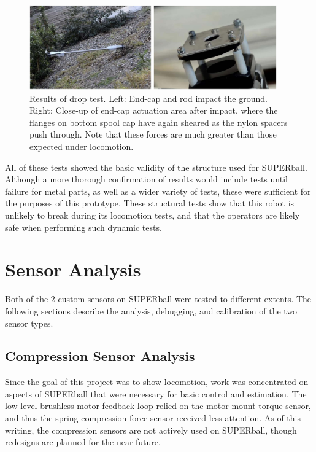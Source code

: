 \documentclass[12pt]{report}
\begin{document}
\begin{figure}[hbt]
  \begin{center}
    \includegraphics[width=0.95\textwidth]{./img/drop_test_results.jpg}
    \caption{Results of drop test. Left: End-cap and rod impact the ground. Right: Close-up of end-cap actuation area after impact, where the flanges on bottom spool cap have again sheared as the nylon spacers push through. Note that these forces are much greater than those expected under locomotion.}
    \label{endcap_drop_test_results}
  \end{center}
\end{figure}

All of these tests showed the basic validity of the structure used for SUPERball.
Although a more thorough confirmation of results would include tests until failure for metal parts, as well as a wider variety of tests, these were sufficient for the purposes of this prototype.
These structural tests show that this robot is unlikely to break during its locomotion tests, and that the operators are likely safe when performing such dynamic tests.


\section{Sensor Analysis}

Both of the 2 custom sensors on SUPERball were tested to different extents.
The following sections describe the analysis, debugging, and calibration of the two sensor types.

\subsection{Compression Sensor Analysis}


Since the goal of this project was to show locomotion, work was concentrated on aspects of SUPERball that were necessary for basic control and estimation.
The low-level brushless motor feedback loop relied on the motor mount torque sensor, and thus the spring compression force sensor received less attention.
As of this writing, the compression sensors are not actively used on SUPERball, though redesigns are planned for the near future.
\end{document}
